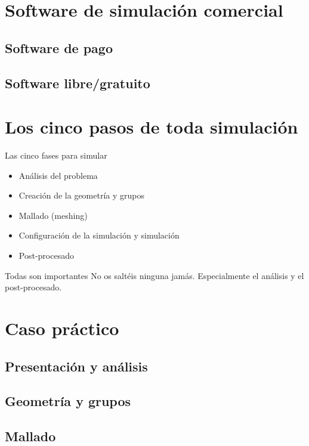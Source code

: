 \documentclass[12pt]{beamer}
\begin{document}
\section{Software de simulación comercial}

\subsection{Software de pago}

\subsection{Software libre/gratuito}

\section{Los cinco pasos de toda simulación}

\begin{frame}{Las cinco fases para simular}
	\begin{itemize}
		\item Análisis del problema
		\item Creación de la geometría y grupos
		\item Mallado (meshing)
		\item Configuración de la simulación y simulación
		\item Post-procesado
	\end{itemize}
	\begin{block}{Todas son importantes}
		No os saltéis ninguna jamás. Especialmente el análisis y el post-procesado.
	\end{block}
\end{frame}

\section{Caso práctico}

\subsection{Presentación y análisis}

\subsection{Geometría y grupos}

\subsection{Mallado}
\end{document}
